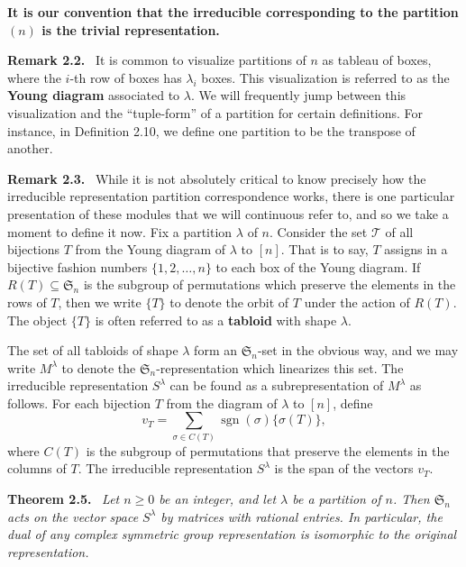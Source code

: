 \documentclass[10pt,a4paper]{article}
\newenvironment{sourceblock}[1]{\par\medskip\noindent\textbf{#1.}\ \itshape}{\par\medskip}
\newenvironment{sourceblockroman}[1]{\par\medskip\noindent\textbf{#1.}\ }{\par\medskip}
\begin{document}
\textbf{It is our convention that the irreducible corresponding to the partition $(n)$ is the trivial representation.}

\begin{sourceblockroman}{Remark 2.2}
It is common to visualize partitions of $n$ as tableau of boxes, where the $i$-th row of boxes has $\lambda_i$ boxes. This visualization is referred to as the \textbf{Young diagram} associated to $\lambda$. We will frequently jump between this visualization and the ``tuple-form'' of a partition for certain definitions. For instance, in Definition 2.10, we define one partition to be the transpose of another.
\end{sourceblockroman}

\begin{sourceblockroman}{Remark 2.3}
While it is not absolutely critical to know precisely how the irreducible representation partition correspondence works, there is one particular presentation of these modules that we will continuous refer to, and so we take a moment to define it now. Fix a partition $\lambda$ of $n$. Consider the set $\mathcal{T}$ of all bijections $T$ from the Young diagram of $\lambda$ to $[n]$. That is to say, $T$ assigns in a bijective fashion numbers $\{1,2,\ldots,n\}$ to each box of the Young diagram. If $R(T)\subseteq\mathfrak{S}_n$ is the subgroup of permutations which preserve the elements in the rows of $T$, then we write $\{T\}$ to denote the orbit of $T$ under the action of $R(T)$. The object $\{T\}$ is often referred to as a \textbf{tabloid} with shape $\lambda$.

The set of all tabloids of shape $\lambda$ form an $\mathfrak{S}_n$-set in the obvious way, and we may write $M^\lambda$ to denote the $\mathfrak{S}_n$-representation which linearizes this set. The irreducible representation $S^\lambda$ can be found as a subrepresentation of $M^\lambda$ as follows. For each bijection $T$ from the diagram of $\lambda$ to $[n]$, define
\[
 v_T=\sum_{\sigma\in C(T)}\operatorname{sgn}(\sigma)\{\sigma(T)\},
\]
where $C(T)$ is the subgroup of permutations that preserve the elements in the columns of $T$. The irreducible representation $S^\lambda$ is the span of the vectors $v_T$.
\end{sourceblockroman}

\begin{sourceblock}{Theorem 2.5}
Let $n\geq 0$ be an integer, and let $\lambda$ be a partition of $n$. Then $\mathfrak{S}_n$ acts on the vector space $S^\lambda$ by matrices with rational entries. In particular, the dual of any complex symmetric group representation is isomorphic to the original representation.
\end{sourceblock}
\end{document}
